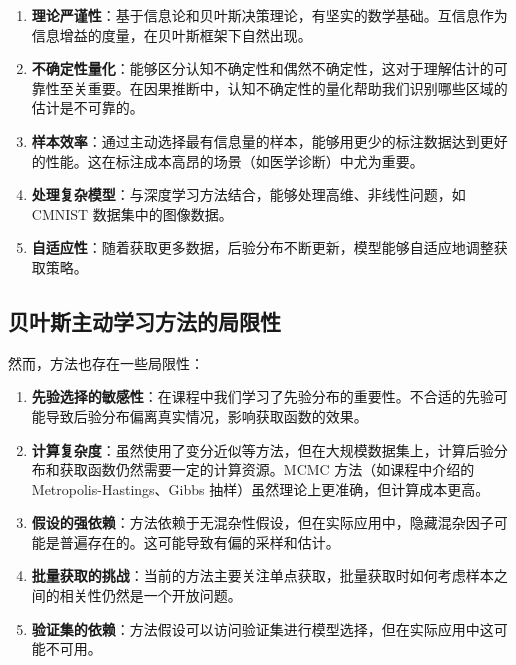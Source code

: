 \documentclass[12pt]{article}
\begin{document}
\begin{enumerate}
\item \textbf{理论严谨性}：基于信息论和贝叶斯决策理论，有坚实的数学基础。互信息作为信息增益的度量，在贝叶斯框架下自然出现。

\item \textbf{不确定性量化}：能够区分认知不确定性和偶然不确定性，这对于理解估计的可靠性至关重要。在因果推断中，认知不确定性的量化帮助我们识别哪些区域的估计是不可靠的。

\item \textbf{样本效率}：通过主动选择最有信息量的样本，能够用更少的标注数据达到更好的性能。这在标注成本高昂的场景（如医学诊断）中尤为重要。

\item \textbf{处理复杂模型}：与深度学习方法结合，能够处理高维、非线性问题，如 CMNIST 数据集中的图像数据。

\item \textbf{自适应性}：随着获取更多数据，后验分布不断更新，模型能够自适应地调整获取策略。
\end{enumerate}

\subsection{贝叶斯主动学习方法的局限性}

然而，方法也存在一些局限性：

\begin{enumerate}
\item \textbf{先验选择的敏感性}：在课程中我们学习了先验分布的重要性。不合适的先验可能导致后验分布偏离真实情况，影响获取函数的效果。

\item \textbf{计算复杂度}：虽然使用了变分近似等方法，但在大规模数据集上，计算后验分布和获取函数仍然需要一定的计算资源。MCMC 方法（如课程中介绍的 Metropolis-Hastings、Gibbs 抽样）虽然理论上更准确，但计算成本更高。

\item \textbf{假设的强依赖}：方法依赖于无混杂性假设，但在实际应用中，隐藏混杂因子可能是普遍存在的。这可能导致有偏的采样和估计。

\item \textbf{批量获取的挑战}：当前的方法主要关注单点获取，批量获取时如何考虑样本之间的相关性仍然是一个开放问题。

\item \textbf{验证集的依赖}：方法假设可以访问验证集进行模型选择，但在实际应用中这可能不可用。
\end{enumerate}
\end{document}
